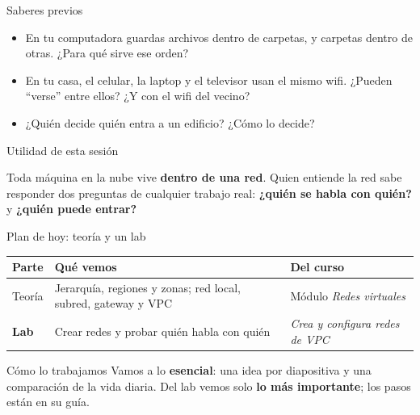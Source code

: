 \documentclass[aspectratio=169,10pt,c]{beamer}
\begin{document}
\begin{frame}{Saberes previos}
\begin{itemize}\setlength\itemsep{10pt}
  \item En tu computadora guardas archivos dentro de carpetas, y carpetas dentro de otras. ¿Para qué sirve ese orden?
  \item En tu casa, el celular, la laptop y el televisor usan el mismo wifi. ¿Pueden ``verse'' entre ellos? ¿Y con el wifi del vecino?
  \item ¿Quién decide quién entra a un edificio? ¿Cómo lo decide?
\end{itemize}
\end{frame}

\begin{frame}[c]{Utilidad de esta sesión}
\begin{center}
\begin{minipage}{.86\textwidth}
{\large Toda máquina en la nube vive \textbf{dentro de una red}. Quien entiende la red sabe responder dos preguntas de cualquier trabajo real: \textbf{¿quién se habla con quién?} y \textbf{¿quién puede entrar?}}
\end{minipage}
\end{center}
\end{frame}

\begin{frame}{Plan de hoy: teoría y un lab}
\renewcommand{\arraystretch}{1.35}
\centering\small
\begin{tabular}{@{}p{1.4cm}>{\raggedright\arraybackslash}p{6.4cm}>{\raggedright\arraybackslash}p{5.1cm}@{}}
\toprule
\textbf{Parte} & \textbf{Qué vemos} & \textbf{Del curso}\\
\midrule
Teoría & Jerarquía, regiones y zonas; red local, subred, gateway y VPC & Módulo \emph{Redes virtuales}\\
\textbf{Lab} & Crear redes y probar quién habla con quién & \emph{Crea y configura redes de VPC}\\
\bottomrule
\end{tabular}
\par\vspace{3mm}
\begin{alertblock}{Cómo lo trabajamos}
\small Vamos a lo \textbf{esencial}: una idea por diapositiva y una comparación de la vida diaria. Del lab vemos solo \textbf{lo más importante}; los pasos están en su guía.
\end{alertblock}
\end{frame}
\end{document}
